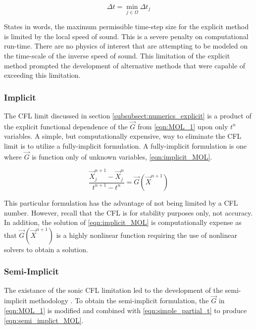 \begin{equation}
\label{eqn:global_cfl}
\Delta t = \min_{j \in \Omega} \Delta t_j
\end{equation}

States in words, the maximum permissible time-step size for the explicit method is limited by the local speed of sound.
This is a severe penalty on computational run-time.
There are no physics of interest that are attempting to be modeled on the time-scale of the inverse speed of sound.
This limitation of the explicit method prompted the development of alternative methods that were capable of exceeding this limitation.

\subsubsection{Implicit}
\label{subsubsect:numerics_fully_implicit}
The CFL limit discussed in section \ref{subsubsect:numerics_explicit} is a product of the explicit functional dependence of the $\vec{G}$ from \eqref{eqn:MOL_1} upon only $t^n$ variables.
A simple, but computationally expensive, way to eliminate the CFL limit is to utilize a fully-implicit formulation.
A fully-implicit formulation is one where $\vec{G}$ is function only of unknown variables, \eqref{eqn:implicit_MOL}.

\begin{equation}
\label{eqn:implicit_MOL}
\frac{ \vec{X}^{n+1}_{j} - \vec{X}^{n}_{j}}{t^{n+1}-t^{n}} = \vec{G}(\vec{X}^{n+1})
\end{equation}

This particular formulation has the advantage of not being limited by a CFL number.
However, recall that the CFL is for stability purposes only, not accuracy.
In addition, the solution of \eqref{eqn:implicit_MOL} is computationally expense as that $\vec{G}(\vec{X}^{n+1})$ is a highly nonlinear function requiring the use of nonlinear solvers to obtain a solution.

\subsubsection{Semi-Implicit}
\label{subsubsect:numerics_semi_implicit}

The existance of the sonic CFL limitation led to the development of the semi-implicit methodology \cite{Liles1978}.
To obtain the semi-implicit formulation, the $\vec{G}$ in \eqref{eqn:MOL_1} is modified and combined with \eqref{eqn:simple_partial_t} to produce \eqref{eqn:semi_implict_MOL}.

